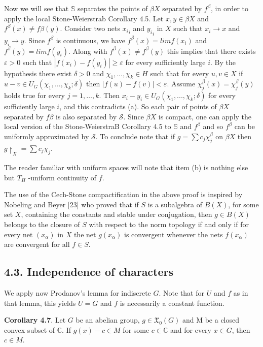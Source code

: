 \documentclass[12pt]{article}
\begin{document}
    Now we will see that $\mathbb{S}$ separates the points of $\beta X$ separated by $f^\beta$, in order to apply the local Stone-Weierstrab
Corollary 4.5. Let $x, y \in \beta X$ and $f^\beta (x) \neq f \beta (y)$. Consider two nets ${x_i}_i$ and ${y_i}_i$ in $X$ such that $x_i \to x$ and $y_i \to y$. Since
$f^\beta$ is continuous, we have $f^\beta (x) = lim f (x_i)$ and $f^\beta (y) = lim f (y_i)$. Along with $f^\beta (x) \neq f^\beta (y)$ this implies that there exists
$\varepsilon > 0$ such that $|f (x_i) - f (y_i)| \geqslant \varepsilon$ for every sufficiently large $i$. By the hypothesis there exist $\delta > 0$ and $\chi_1,...,\chi_k \in H$
such that for every $u, v \in X$ if $u - v \in U_G (\chi_1, \dots ,\chi_k; \delta)$ then $| f (u) - f (v)| < \varepsilon$. Assume $\chi^\beta_j (x) = \chi^\beta_j (y)$ holds true for every
$j = 1, \dots ,k$. Then $x_i - y_i \in U_G(\chi_1,...,\chi_k; \delta)$ for every sufficiently large $i$, and this contradicts (a). So each pair of points
of $\beta X$ separated by $f \beta$ is also separated by $\mathcal{S}$. Since $\beta X$ is compact, one can apply the local version of the Stone-WeierstraB
Corollary 4.5 to $\mathbb{S}$ and $f^\beta$ and so $f^\beta$ can be uniformly approximated by $\mathcal{S}$. To conclude note that if $g = \sum c_j\chi^\beta_j$ on $\beta X$
then $g \upharpoonright_X = \sum c_j \chi_j$.


    The reader familiar with uniform spaces will note that item (b) is nothing else but $T_H$ -uniform continuity of $f$.


    The use of the Cech-Stone compactification in the above proof is inspired by Nobeling and Beyer [23] who proved that
if $S$ is a subalgebra of $B(X)$, for some set $X$, containing the constants and stable under conjugation, then $g \in B(X)$ belongs
to the closure of $S$ with respect to the norm topology if and only if for every net $(x_\alpha)$ in $X$ the net $g(x_\alpha)$ is convergent
whenever the nets $f(x_\alpha)$ are convergent for all $f \in S$.


\subsection{4.3. Independence of characters}


    We apply now Prodanov's lemma for indiscrete $G$. Note that for $U$ and $f$ as in that lemma, this yields $U = G$ and $f$ is
necessarily a constant function.


\textbf{Corollary 4.7}. Let $G$ be an abelian group, $g \in \mathfrak{X}_0 (G)$ and M be a closed convex subset of $\mathbb{C}$. If $g(x) - c \in M$ for some $c \in \mathbb{C}$ and for
every $x \in G$, then $c \in M$.
\end{document}
